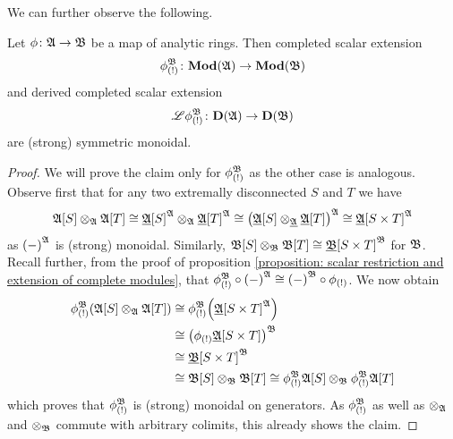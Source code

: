 We can further observe the following.
\begin{lemma}
	\label{lemma: completed scalar extension is monoidal}
	
	Let $\phi\colon {\mathfrak{A}}\to {\mathfrak{B}}$ be a map of analytic rings. Then completed scalar extension
		$${\phi_{(!)}^{{\mathfrak{B}}}}\colon {{\mathbf{Mod}}({\mathfrak{A}})}\to{{\mathbf{Mod}}({\mathfrak{B}})}$$
	and derived completed scalar extension
		$${\mathscr{L}\phi_{(!)}^{{\mathfrak{B}}}}\colon {{\mathbf{D}}({\mathfrak{A}})}\to{{\mathbf{D}}({\mathfrak{B}})}$$
	are (strong) symmetric monoidal.
\end{lemma}
\begin{proof}
	We will prove the claim only for ${\phi_{(!)}^{{\mathfrak{B}}}}$ as the other case is analogous. Observe first that for any two extremally disconnected $S$ and $T$ we have
		$$\pfree{A}{S}\otimes_\preAnaRing{A} \pfree{A}{T} \cong \ufree{A}{S}^\completionSymbol{\preAnaRing{A}} \otimes_\preAnaRing{A} \ufree{A}{T}^\completionSymbol{\preAnaRing{A}}\cong\completion{\ufree{A}{S}\otimes_\underlying{A}\ufree{A}{T}}{\preAnaRing{A}} \cong \ufree{A}{S\times T}^\completionSymbol{\preAnaRing{A}}$$
	as $\completion{-}{\preAnaRing{A}}$ is (strong) monoidal. Similarly, ${{{\mathfrak{B}}[S]}}\otimes_{\mathfrak{B}} {{{\mathfrak{B}}[T]}} \cong {{{\underline{{\mathfrak{B}}}}[S\times T]}}^{\mathfrak{B}}$ for ${\mathfrak{B}}$. Recall further, from the proof of proposition \ref{proposition: scalar restriction and extension of complete modules}, that $\completedScalarExtension{\phi}{\preAnaRing{B}}\circ \completion{-}{\preAnaRing{A}} \cong \completion{-}{\preAnaRing{B}}\circ \scalarExtension{\phi}$. We now obtain
	\begin{align*}
		\completedScalarExtension{\phi}{\preAnaRing{B}}\mleft(\pfree{A}{S}\otimes_\preAnaRing{A}\pfree{A}{T}\mright)
		&\cong \completedScalarExtension{\phi}{\preAnaRing{B}} \mleft(\ufree{A}{S\times T}^\completionSymbol{\preAnaRing{A}}\mright)\\
		&\cong \mleft(\scalarExtension{\phi}\ufree{A}{S\times T}\mright)^\completionSymbol{\preAnaRing{B}}\\
		&\cong \ufree{B}{S\times T}^\completionSymbol{\preAnaRing{B}}\\
		&\cong\pfree{B}{S}\otimes_\preAnaRing{B}\pfree{B}{T} \cong \completedScalarExtension{\phi}{\preAnaRing{B}}\pfree{A}{S} \otimes_\preAnaRing{B} \completedScalarExtension{\phi}{\preAnaRing{B}}\pfree{A}{T}
	\end{align*}
	which proves that ${\phi_{(!)}^{{\mathfrak{B}}}}$ is (strong) monoidal on generators. As ${\phi_{(!)}^{{\mathfrak{B}}}}$ as well as $\otimes_{\mathfrak{A}}$ and $\otimes_{\mathfrak{B}}$ commute with arbitrary colimits, this already shows the claim.
\end{proof}

